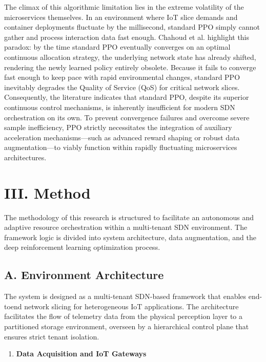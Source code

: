 The climax of this algorithmic limitation lies in the extreme volatility of the microservices themselves. In an environment where IoT slice demands and container deployments fluctuate by the millisecond, standard PPO simply cannot gather and process interaction data fast enough. Chahoud et al. highlight this paradox: by the time standard PPO eventually converges on an optimal continuous allocation strategy, the underlying network state has already shifted, rendering the newly learned policy entirely obsolete\cite{b18}. Because it fails to converge fast enough to keep pace with rapid environmental changes, standard PPO inevitably degrades the Quality of Service (QoS) for critical network slices. Consequently, the literature indicates that standard PPO, despite its superior continuous control mechanisms, is inherently insufficient for modern SDN orchestration on its own. To prevent convergence failures and overcome severe sample inefficiency, PPO strictly necessitates the integration of auxiliary acceleration mechanisms---such as advanced reward shaping or robust data augmentation---to viably function within rapidly fluctuating microservices architectures\cite{b18}.

\section{III. Method}\label{iii.-method}

The methodology of this research is structured to facilitate an autonomous and adaptive resource orchestration within a multi-tenant SDN environment. The framework logic is divided into system architecture, data augmentation, and the deep reinforcement learning optimization process.

\subsection{A. Environment Architecture}\label{a.-environment-architecture}

The system is designed as a multi-tenant SDN-based framework that enables end-toend network slicing for heterogeneous IoT applications. The architecture facilitates the flow of telemetry data from the physical perception layer to a partitioned storage environment, overseen by a hierarchical control plane that ensures strict tenant isolation.

\begin{enumerate}
\def\labelenumi{\arabic{enumi})}
\item
  \textbf{Data Acquisition and IoT Gateways}
\end{enumerate}


